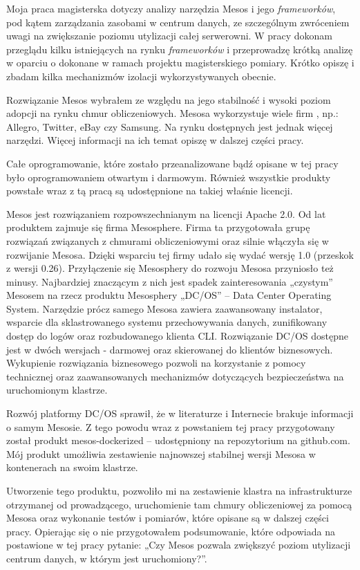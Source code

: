\documentclass[10pt,a4paper,titlepage,twoside]{report}
\begin{document}
Moja praca magisterska dotyczy analizy narzędzia Mesos i jego \textit{frameworków}, pod kątem zarządzania zasobami w centrum danych, ze szczególnym zwróceniem uwagi na zwiększanie poziomu utylizacji całej serwerowni. W pracy dokonam przeglądu kilku istniejących na rynku \textit{frameworków} i przeprowadzę krótką analizę w oparciu o dokonane w ramach projektu magisterskiego pomiary. Krótko opiszę i zbadam kilka mechanizmów izolacji wykorzystywanych obecnie.

Rozwiązanie Mesos wybrałem ze względu na jego stabilność i wysoki poziom adopcji na rynku chmur obliczeniowych. Mesosa wykorzystuje wiele firm \cite{ad16}, np.: Allegro, Twitter, eBay czy Samsung. Na rynku dostępnych jest jednak więcej narzędzi. Więcej informacji na ich temat opiszę w dalszej części pracy.

Całe oprogramowanie, które zostało przeanalizowane bądź opisane w tej pracy było oprogramowaniem otwartym i darmowym. Również wszystkie produkty powstałe wraz z tą pracą są udostępnione na takiej właśnie licencji.

Mesos jest rozwiązaniem rozpowszechnianym na licencji Apache 2.0. Od lat produktem zajmuje się firma Mesosphere. Firma ta przygotowała grupę rozwiązań związanych z chmurami obliczeniowymi oraz silnie włączyła się w rozwijanie Mesosa. Dzięki wsparciu tej firmy udało się wydać wersję 1.0 (przeskok z wersji 0.26). Przyłączenie się Mesosphery do rozwoju Mesosa przyniosło też minusy. Najbardziej znaczącym z nich jest spadek zainteresowania „czystym” Mesosem na rzecz produktu Mesosphery „DC/OS” – Data Center Operating System. Narzędzie prócz samego Mesosa zawiera zaawansowany instalator, wsparcie dla sklastrowanego systemu przechowywania danych, zunifikowany dostęp do logów oraz rozbudowanego klienta CLI. Rozwiązanie DC/OS dostępne jest w dwóch wersjach - darmowej oraz skierowanej do klientów biznesowych. Wykupienie rozwiązania biznesowego pozwoli na korzystanie z pomocy technicznej oraz zaawansowanych mechanizmów dotyczących bezpieczeństwa na uruchomionym klastrze.

Rozwój platformy DC/OS sprawił, że w literaturze i Internecie brakuje informacji o samym Mesosie. Z tego powodu wraz z powstaniem tej pracy przygotowany został produkt mesos-dockerized – udostępniony na repozytorium na github.com. Mój produkt umożliwia zestawienie najnowszej stabilnej wersji Mesosa w kontenerach na swoim klastrze.

Utworzenie tego produktu, pozwoliło mi na zestawienie klastra na infrastrukturze otrzymanej od prowadzącego, uruchomienie tam chmury obliczeniowej za pomocą Mesosa oraz wykonanie testów i pomiarów, które opisane są w dalszej części pracy. Opierając się o nie przygotowałem podsumowanie, które odpowiada na postawione w tej pracy pytanie: „Czy Mesos pozwala zwiększyć poziom utylizacji centrum danych, w którym jest uruchomiony?”.
\end{document}
